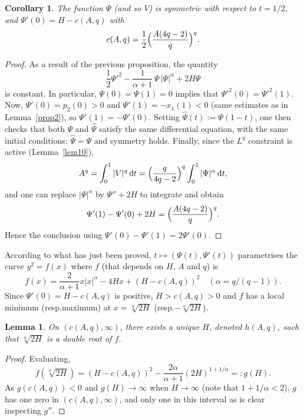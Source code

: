 \documentclass[10pt,a4paper]{amsart}
\providecommand{\resp}{resp.}
\theoremstyle{plain}
\newtheorem{lemma}[theorem]{Lemma}
\newtheorem{cor}[theorem]{Corollary}
\theoremstyle{definition}
\renewcommand{\d}{\mathrm{d}}
\begin{document}
\begin{cor} \label{cor13}
The function $\Psi$ (and so $V$) is symmetric with respect to $t=1/2$, and
$\Psi'(0)=H-c(A,q)$ with
\[
c(A,q) = \frac{1}{2} \Bigl(\frac{A(4q-2)}{q} \Bigr)^q.
\]
\end{cor}
\begin{proof}
As a result of the previous proposition, the quantity
\[
\frac{1}{2}\Psi'^2-\frac{1}{\alpha+1}\,\Psi\,|\Psi|^\alpha+2H\Psi
\]
is constant. In particular, $\Psi(0)=\Psi(1)=0$ implies that $\Psi'^2(0)=\Psi'^2(1)$.
Now, $\Psi'(0)=p_2(0)>0$ and $\Psi'(1)=-x_1(1)<0$ (same estimates as in
Lemma~\ref{prop2}), so $\Psi'(1)=-\Psi'(0)$. Setting
$\hat{\Psi}(t):=\Psi(1-t)$, one then checks that both $\Psi$ and $\hat{\Psi}$ satisfy
the same differential equation, with the same initial conditions: $\hat{\Psi}=\Psi$
and symmetry holds.
Finally, since the $L^q$ constraint is
active (Lemma~\ref{lem10}),
\[
A^q = \int_0^1 |V|^q\,\d t
= \Bigl(\frac{q}{4q-2} \Bigr)^q \int_0^1 |\Psi|^\alpha\,\d t,
\]
and one can replace $|\Psi|^\alpha$ by $\Psi''+2H$ to integrate and obtain
\[
\Psi'(1)-\Psi'(0)+2H = \Bigl(\frac{A(4q-2)}{q} \Bigr)^q.
\]
Hence the conclusion using $\Psi'(0)-\Psi'(1)=2\Psi'(0)$.
\end{proof}

According to what has just been proved, $t \mapsto (\Psi(t),\Psi'(t))$
parametrises the curve $y^2=f(x)$ where $f$ (that depends on $H$, $A$ and $q$) is
\begin{equation} \label{eq61}
f(x) = \frac{2}{\alpha+1}x|x|^\alpha-4Hx+(H-c(A,q))^2 \quad (\alpha=q/(q-1)).
\end{equation}
Since $\Psi'(0)=H-c(A,q)$ is positive, $H > c(A,q) > 0$ and $f$ has a local minimum
(\resp maximum) at $x=\sqrt[\alpha]{2H}$ (\resp $-\sqrt[\alpha]{2H}$).

\begin{lemma} \label{lem12}
On $(c(A,q),\infty)$, there exists a unique $H$, denoted $h(A,q)$,
such that $\sqrt[\alpha]{2H}$ is a double root of $f$.
\end{lemma}
\begin{proof}
Evaluating,
\[
f(\sqrt[\alpha]{2H}) = (H-c(A,q))^2-\frac{2\alpha}{\alpha+1}(2H)^{1+1/\alpha}
=: g(H).
\]
As $g(c(A,q))<0$ and $g(H) \to \infty$ when $H \to \infty$ (note that $1+1/\alpha<2$),
$g$ has one zero in $(c(A,q),\infty)$, and only one in this interval as is clear
inspecting $g''$.
\end{proof}
\end{document}
